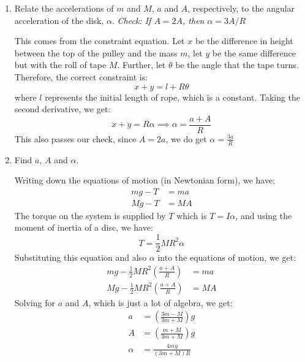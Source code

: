 \documentclass[10pt]{article}
\begin{document}
	\begin{enumerate}[label=\alph*)]
		\item Relate the accelerations of $m$ and $M$, $a$ and $A$, respectively, to the angular acceleration of
			the disk, $\alpha$. \textit{Check: If $A = 2A$, then $\alpha = 3A/R$}

			\begin{solution}
				This comes from the constraint equation. Let $x$ be the difference in height between the top
				of the pulley and the mass $m$, let $y$ be the same difference but with the roll of tape $M$.
				Further, let $\theta$ be the angle that the tape turns. Therefore, the correct constraint is: 
				\[
				x + y = l + R \theta
				\] 
				where $l$ represents the initial length of rope, which is a constant. Taking the second 
				derivative, we get: 
				\[
				\ddot x + \ddot y = R\alpha \implies \alpha = \frac{a + A}{R}
				\] 
				This also passes our check, since $A = 2a$, we do get $\alpha = \frac{3a}{R}$
			\end{solution}
		\item Find $a$, $A$ and $\alpha$.

			\begin{solution}
				Writing down the equations of motion (in Newtonian form), we have; 
				\begin{align*}
					mg - T &= ma \\
					Mg - T &= MA 
				\end{align*}
				The torque on the system is supplied by $T$ which is $T = I \alpha$, and using the moment of 
				inertia of a disc, we have:
				\[
				T = \frac{1}{2}MR^2 \alpha
				\] 
				Substituting this equation and also $\alpha$ into the equations of motion, we get:
				\begin{align*}
					mg - \frac{1}{2}MR^2 \left(\frac{a + A}{R}\right) &= ma\\
					Mg - \frac{1}{2}MR^2 \left(\frac{a + A}{R}\right) &= MA
				\end{align*}
				Solving for $a$ and $A$, which is just a lot of algebra, we get:
				\begin{align*}
					a &= \left( \frac{3m - M}{3m + M} \right) g\\
					A &= \left( \frac{m + M}{3m+M} \right) g \\
					\alpha &= \frac{4mg}{(3m + M)R}
				\end{align*}
			\end{solution}
	\end{enumerate}
\end{document}
